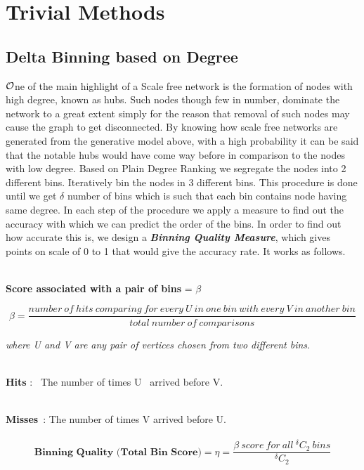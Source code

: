 \documentclass{article}
\begin{document}
\section{Trivial Methods}
\subsection{Delta Binning based on Degree}
\hspace{.17in}$\cal O$ne of the main highlight of a Scale free network is the formation of nodes with high degree, known as hubs. Such nodes though few in number, dominate the network to a great extent simply for the reason that removal of such nodes may cause the graph to get disconnected. By knowing how scale free networks are generated from the generative model above, with a high probability it can be said that the notable hubs would have come way before in comparison to the nodes with low degree. Based on Plain Degree Ranking we segregate the nodes into 2 different bins. Iteratively bin the nodes in 3 different bins. This procedure is done until we get $\delta$ number of bins which is such that each bin contains node having same degree. In each step of the procedure we apply a measure to find out the accuracy with which we can predict the order of the bins. In order to find out how accurate this is, we design a \textbf{\emph{Binning Quality Measure}}, which gives points on scale of 0 to 1 that would give the accuracy rate. It works as follows. 	
\\\

\textbf{ Score associated with a pair of bins }= $\beta$

\begin{equation}
\beta = \frac{number\ of\ hits\ comparing\ for\ every\ U\ in\ one\ bin\ with\ every\ V\ in\ another\ bin}{total\ number\ of\ comparisons}
\end{equation}

\emph{where U and V are any pair of vertices chosen from two different bins}.
\\\
 
\textbf{Hits} :  The number of times U  arrived before V.
\\\

\textbf{Misses} : The number of times V arrived before U.
\\\
\begin{equation}
\textbf{Binning\ Quality (Total\ Bin\ Score)} =\eta= \frac{\beta\ score\ for\ all\ ^\delta C_2\ bins}{^\delta C_2}
\end{equation}
\\\
\end{document}

